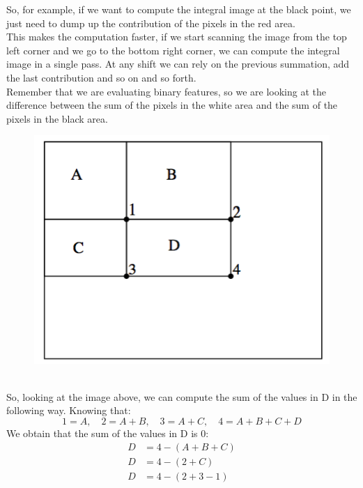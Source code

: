So, for example, if we want to compute the integral image at the black point, we just need to dump up the contribution of the pixels in the red area.
\\This makes the computation faster, if we start scanning the image from the top left corner and we go to the bottom right corner, we can compute the integral image in a single pass.
At any shift we can rely on the previous summation, add the last contribution and so on and so forth.
\\Remember that we are evaluating binary features, so we are looking at the difference between the sum of the pixels in the white area and the sum of the pixels in the black area.
\begin{figure}[h]
    \centering
    \includegraphics[scale=0.4]{Figures/IntegralImage2.png}
\end{figure}
\\So, looking at the image above, we can compute the sum of the values in D in the following way.
Knowing that: 
\[1 = A,\quad 2 = A + B,\quad 3 = A + C,\quad 4 = A + B + C + D\]
We obtain that the sum of the values in D is $0$:
\begin{equation}
    \begin{split}
        D & = 4 - (A + B + C) \\
        D & = 4 - (2 + C) \\
        D & = 4 - (2 + 3 - 1) 
    \end{split}
\end{equation}

